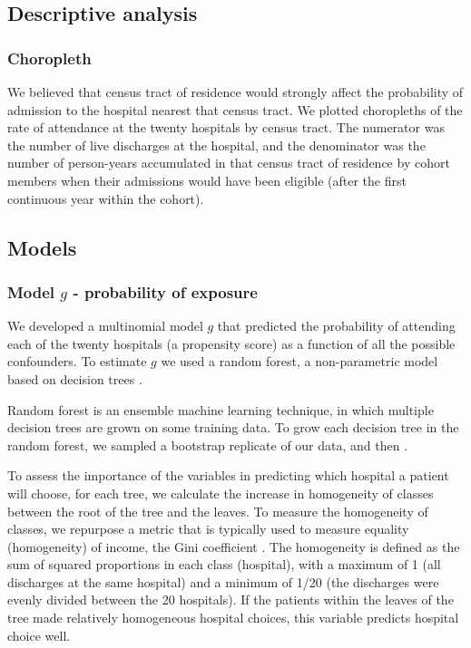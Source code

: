 \documentclass[]{article}\usepackage[]{graphicx}\usepackage[]{color}
\begin{document}
\subsection{Descriptive analysis}

\subsubsection{Choropleth}
We believed that census tract of residence would strongly affect the probability of admission to the hospital nearest that census tract. We plotted choropleths of the rate of attendance at the twenty hospitals by census tract. The numerator was the number of live discharges at the hospital, and the denominator was the number of person-years accumulated in that census tract of residence by cohort members when their admissions would have been eligible (after the first continuous year within the cohort).

\subsection{Models}
\subsubsection{Model $g$ - probability of exposure}
We developed a multinomial model $g$ that predicted the probability of attending each of the twenty hospitals (a propensity score) as a function of all the possible confounders. To estimate $g$ we used a random forest, a non-parametric model based on decision trees \supercite{breiman_random_2001}. 

Random forest is an ensemble machine learning technique, in which multiple decision trees are grown on some training data. To grow each decision tree in the random forest, we sampled a bootstrap replicate of our data, and then . 

To assess the importance of the variables in predicting which hospital a patient will choose, for each tree, we calculate the increase in homogeneity of classes between the root of the tree and the leaves. To measure the homogeneity of classes, we repurpose a metric that is typically used to measure equality (homogeneity) of income, the Gini coefficient \supercite{gini_variabilita_1912}. The homogeneity is defined as the sum of squared proportions in each class (hospital), with a maximum of 1 (all discharges at the same hospital) and a minimum of 1/20 (the discharges were evenly divided between the 20 hospitals). If the patients within the leaves of the tree made relatively homogeneous hospital choices, this variable predicts hospital choice well.
\end{document}

